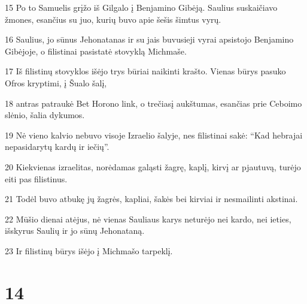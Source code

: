 \par 15 Po to Samuelis grįžo iš Gilgalo į Benjamino Gibėją. Saulius suskaičiavo žmones, esančius su juo, kurių buvo apie šešis šimtus vyrų. 
\par 16 Saulius, jo sūnus Jehonatanas ir su jais buvusieji vyrai apsistojo Benjamino Gibėjoje, o filistinai pasistatė stovyklą Michmaše. 
\par 17 Iš filistinų stovyklos išėjo trys būriai naikinti krašto. Vienas būrys pasuko Ofros kryptimi, į Šualo šalį, 
\par 18 antras patraukė Bet Horono link, o trečias­į aukštumas, esančias prie Ceboimo slėnio, šalia dykumos. 
\par 19 Nė vieno kalvio nebuvo visoje Izraelio šalyje, nes filistinai sakė: “Kad hebrajai nepasidarytų kardų ir iečių”. 
\par 20 Kiekvienas izraelitas, norėdamas galąsti žagrę, kaplį, kirvį ar pjautuvą, turėjo eiti pas filistinus. 
\par 21 Todėl buvo atbukę jų žagrės, kapliai, šakės bei kirviai ir nesmailinti akstinai. 
\par 22 Mūšio dienai atėjus, nė vienas Sauliaus karys neturėjo nei kardo, nei ieties, išskyrus Saulių ir jo sūnų Jehonataną. 
\par 23 Ir filistinų būrys išėjo į Michmašo tarpeklį.



\chapter{14}

